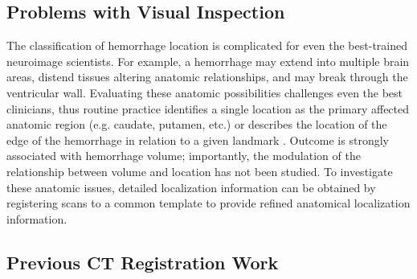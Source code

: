 \documentclass[10pt]{article}\usepackage[]{graphicx}\usepackage[]{color}
\begin{document}
\subsection{Problems with Visual Inspection}
The classification of hemorrhage location is complicated for even the best-trained neuroimage scientists. For example, a hemorrhage may extend into multiple brain areas, distend tissues altering anatomic relationships, and may break through the ventricular wall.  Evaluating these anatomic possibilities challenges even the best clinicians, thus routine practice identifies a single location as the primary affected anatomic region (e.g. caudate, putamen, etc.) or describes the location of the edge of the hemorrhage in relation to a given landmark \citep{ziai_multicenter_2013}.  Outcome is strongly associated with hemorrhage volume; importantly, the modulation of the relationship between volume and location has not been studied.  To investigate these anatomic issues, detailed localization information can be obtained by registering scans to a common template to provide refined anatomical localization information.  





\subsection{Previous CT Registration Work}
\end{document}
